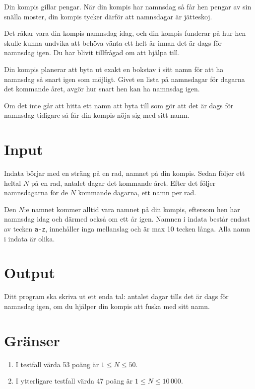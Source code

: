 
Din kompis gillar pengar. När din kompis har namnsdag så får hen pengar av sin snälla moster,
din kompis tycker därför att namnsdagar är jätteskoj.

Det råkar vara din kompis namnsdag idag, och din kompis funderar på hur hen skulle kunna
undvika att behöva vänta ett helt år innan det är dags för namnsdag igen. Du har blivit tillfrågad
om att hjälpa till.

Din kompis planerar att byta ut exakt en bokstav i sitt namn för att ha namnsdag så
snart igen som möjligt. Givet en lista på namnsdagar för dagarna det kommande
året, avgör hur snart hen kan ha namnsdag igen.

Om det inte går att hitta ett namn att byta till som gör att det är dags för namnsdag tidigare så
får din kompis nöja sig med sitt namn.

\section*{Input}
Indata börjar med en sträng på en rad, namnet på din kompis.
Sedan följer ett heltal $N$ på en rad, antalet dagar det kommande året.
Efter det följer namnsdagarna för de $N$ kommande dagarna, ett namn per rad.

Den $N$:e namnet kommer alltid vara namnet på din kompis,
eftersom hen har namnsdag idag och därmed också om ett år igen. Namnen i indata
består endast av tecken \texttt{a-z}, innehåller inga mellanslag och är max 10 tecken långa. Alla namn i indata är olika.


\section*{Output}
Ditt program ska skriva ut ett enda tal: antalet dagar tills det är dags för
namnsdag igen, om du hjälper din kompis att fuska med sitt namn. 

\section*{Gränser}
\begin{enumerate}
\item I testfall värda 53 poäng är $1 \le N \le 50$.
\item I ytterligare testfall värda 47 poäng är $1 \le N \le 10\,000$.
\end{enumerate}

